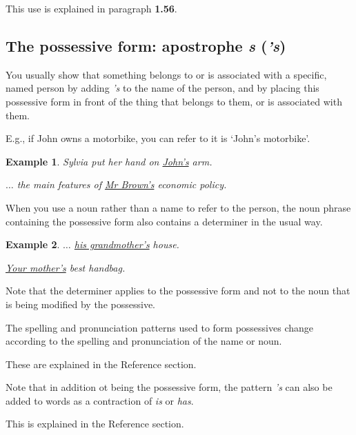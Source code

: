 \documentclass[oneside]{book}
\numberwithin{equation}{section}
\newtheorem{example}{Example}[section]
\begin{document}
This use is explained in paragraph \textbf{1.56}.

\subsection{The possessive form: apostrophe \textit{s} (\textit{'s})}
\noindent{} You usually show that something belongs to or is associated with a specific, named person by adding \textit{'s} to the name of the person, and by placing this possessive form in front of the thing that belongs to them, or is associated with them.

E.g., if John owns a motorbike, you can refer to it is `John's motorbike'.
\begin{example}
    Sylvia put her hand on \underline{John's} arm.
    
    $\ldots$ the main features of \underline{Mr Brown's} economic policy.
\end{example}
When you use a noun rather than a name to refer to the person, the noun phrase containing the possessive form also contains a determiner in the usual way.
\begin{example}
    $\ldots$ \underline{his grandmother's} house.
    
    \underline{Your mother's} best handbag.
\end{example}
Note that the determiner applies to the possessive form and not to the noun that is being modified by the possessive.

%
\noindent{} The spelling and pronunciation patterns used to form possessives change according to the spelling and pronunciation of the name or noun.

These are explained in the Reference section.

%
\noindent{} Note that in addition ot being the possessive form, the pattern \textit{'s} can also be added to words as a contraction of \textit{is} or \textit{has}.

This is explained in the Reference section.
\end{document}
